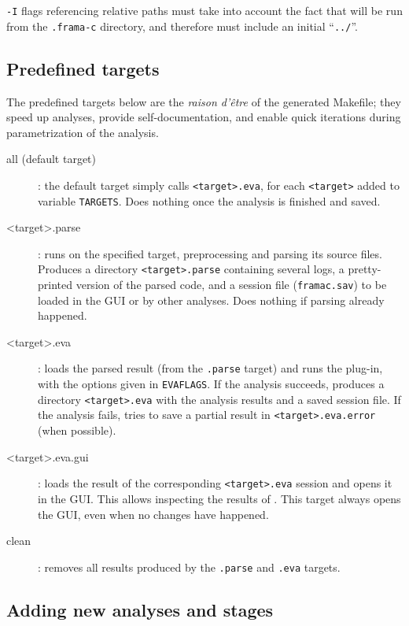 \begin{important}
\texttt{-I} flags referencing relative paths must take into account the
fact that \FramaC will be run from the \texttt{.frama-c} directory, and
therefore must include an initial ``\texttt{../}''.
\end{important}

\subsection{Predefined targets}

The predefined targets below are the {\em raison d'être} of the generated
Makefile; they speed up analyses, provide self-documentation, and enable
quick iterations during parametrization of the analysis.

\begin{description}
\item[all (default target)]: the default target simply calls
  \texttt{<target>.eva}, for each \texttt{<target>} added to variable
  \texttt{TARGETS}. Does nothing once the analysis is finished and saved.
\item[<target>.parse]: runs \FramaC on the specified target, preprocessing
  and parsing its source files. Produces a directory \texttt{<target>.parse}
  containing several logs, a pretty-printed version of the parsed code, and
  a \FramaC session file (\texttt{framac.sav}) to be loaded in the GUI or by
  other analyses. Does nothing if parsing already happened.
\item[<target>.eva]: loads the parsed result (from the \texttt{.parse} target)
  and runs the \Value plug-in, with the options given in \texttt{EVAFLAGS}.
  If the analysis succeeds, produces a directory \texttt{<target>.eva} with the
  analysis results and a saved session file.
  If the analysis fails, tries to save a partial result in
  \texttt{<target>.eva.error} (when possible).
\item[<target>.eva.gui]: loads the result of the corresponding
  \texttt{<target>.eva} session and opens it in the GUI. This allows inspecting
  the results of \Value. This target always opens the GUI, even when no
  changes have happened.
\item[clean]: removes all results produced by the \texttt{.parse} and
  \texttt{.eva} targets.
\end{description}

\subsection{Adding new analyses and stages}


